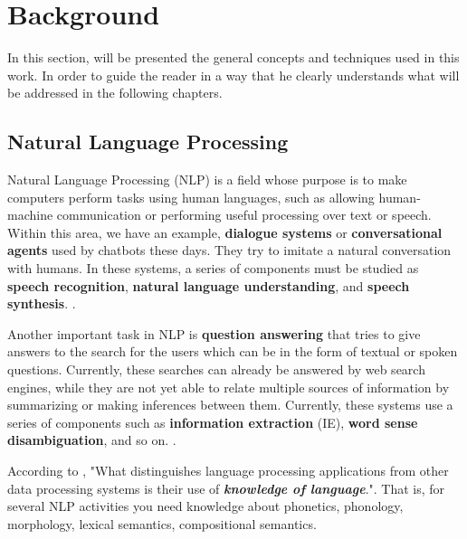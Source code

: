 \section{Background}\label{chap:background}


In this section, will be presented the general concepts and techniques used in this work. In order to guide the reader in a way that he clearly understands what will be addressed in the following chapters.

\subsection{Natural Language Processing}

Natural Language Processing (NLP) is a field whose purpose is to make computers perform tasks using human languages, such as allowing human-machine communication or performing useful processing over text or speech. Within this area, we have an example, \textbf{dialogue systems} or \textbf{conversational agents} used by chatbots these days. They try to imitate a natural conversation with humans. In these systems, a series of components must be studied as \textbf{speech recognition}, \textbf{natural language understanding}, and \textbf{speech synthesis}. \cite{Jurafsky:2009:SLP:1214993}.

Another important task in NLP is \textbf{question answering} that tries to give answers to the search for the users which can be in the form of textual or spoken questions. Currently, these searches can already be answered by web search engines, while they are not yet able to relate multiple sources of information by summarizing or making inferences between them. Currently, these systems use a series of components such as \textbf{information extraction} (IE), \textbf{word sense disambiguation}, and so on. \cite{Jurafsky:2009:SLP:1214993}.

According to , "What distinguishes language processing applications from other data processing systems is their use of \textit{\textbf{knowledge of language}}.". That is, for several NLP activities you need knowledge about phonetics, phonology, morphology, lexical semantics, compositional semantics.



